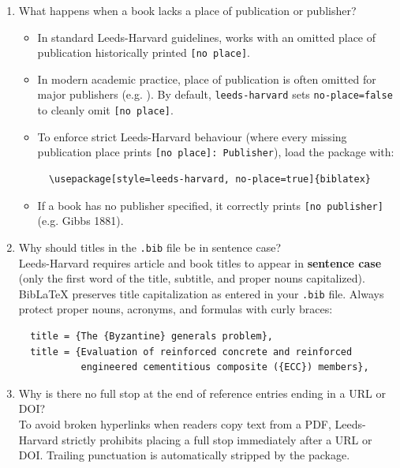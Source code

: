 \documentclass[a4paper,11pt]{article}
\begin{document}
\begin{enumerate}
\item What happens when a book lacks a place of publication or publisher?
\begin{itemize}
  \item In standard Leeds-Harvard guidelines, works with an omitted place of publication historically printed \texttt{[no place]}.
  \item In modern academic practice, place of publication is often omitted for major publishers (e.g. \parencite{hawking1988}). By default, \texttt{leeds-harvard} sets \texttt{no-place=false} to cleanly omit \texttt{[no place]}.
  \item To enforce strict Leeds-Harvard behaviour (where every missing publication place prints \texttt{[no place]: Publisher}), load the package with:
  \begin{verbatim}
  \usepackage[style=leeds-harvard, no-place=true]{biblatex}
  \end{verbatim}
  \item If a book has no publisher specified, it correctly prints \texttt{[no publisher]} (e.g. Gibbs 1881).
\end{itemize}

\item Why should titles in the \texttt{.bib} file be in sentence case?\\
Leeds-Harvard requires article and book titles to appear in \textbf{sentence case} (only the first word of the title, subtitle, and proper nouns capitalized). BibLaTeX preserves title capitalization as entered in your \texttt{.bib} file. Always protect proper nouns, acronyms, and formulas with curly braces:
\begin{verbatim}
  title = {The {Byzantine} generals problem},
  title = {Evaluation of reinforced concrete and reinforced
           engineered cementitious composite ({ECC}) members},
\end{verbatim}

\item Why is there no full stop at the end of reference entries ending in a URL or DOI?\\
To avoid broken hyperlinks when readers copy text from a PDF, Leeds-Harvard strictly prohibits placing a full stop immediately after a URL or DOI. Trailing punctuation is automatically stripped by the package.





\end{enumerate}
\end{document}
